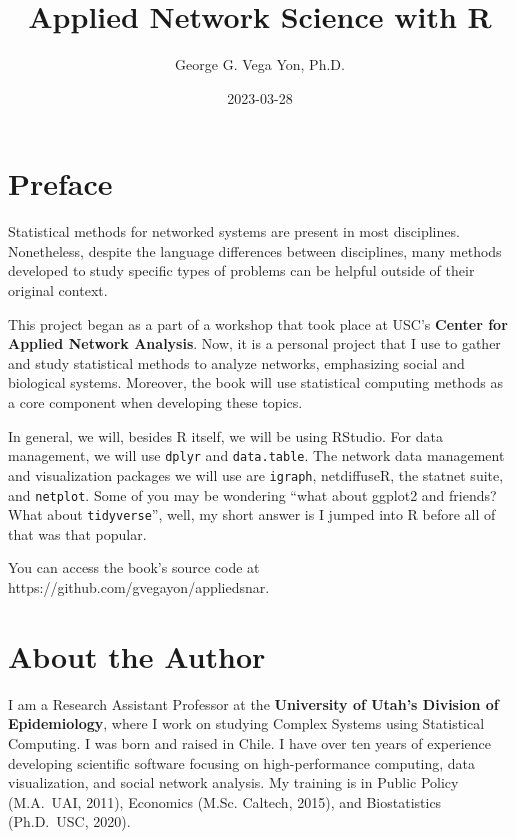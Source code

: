 \documentclass[
]{book}
\title{Applied Network Science with R}
\author{George G. Vega Yon, Ph.D.}
\date{2023-03-28}
\begin{document}
\maketitle

{
\setcounter{tocdepth}{1}
\tableofcontents
}
\hypertarget{preface}{%
\chapter{Preface}\label{preface}}

\renewcommand{\Pr}[1]{\mbox{Pr}\left(#1\right)}
\renewcommand{\exp}[1]{\mbox{exp}\left\{#1\right\}}

Statistical methods for networked systems are present in most disciplines. Nonetheless, despite the language differences between disciplines, many methods developed to study specific types of problems can be helpful outside of their original context.

This project began as a part of a workshop that took place at USC's \textbf{Center for Applied Network Analysis}. Now, it is a personal project that I use to gather and study statistical methods to analyze networks, emphasizing social and biological systems. Moreover, the book will use statistical computing methods as a core component when developing these topics.

In general, we will, besides R itself, we will be using RStudio. For data management, we will use \texttt{dplyr} and \texttt{data.table}. The network data management and visualization packages we will use are \texttt{igraph}, netdiffuseR, the statnet suite, and \texttt{netplot}. Some of you may be wondering ``what about ggplot2 and friends? What about \texttt{tidyverse}'', well, my short answer is I jumped into R before all of that was that popular.

You can access the book's source code at https://github.com/gvegayon/appliedsnar.

\hypertarget{about-the-author}{%
\chapter{About the Author}\label{about-the-author}}

I am a Research Assistant Professor at the \textbf{University of Utah's Division of Epidemiology}, where I work on studying Complex Systems using Statistical Computing. I was born and raised in Chile. I have over ten years of experience developing scientific software focusing on high-performance computing, data visualization, and social network analysis. My training is in Public Policy (M.A.~UAI, 2011), Economics (M.Sc. Caltech, 2015), and Biostatistics (Ph.D.~USC, 2020).
\end{document}
